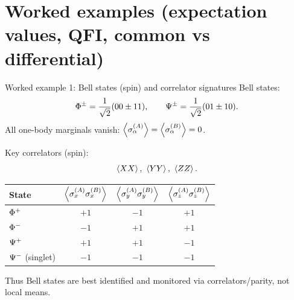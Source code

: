 \documentclass[aspectratio=169]{beamer}
\newcommand{\sA}[1]{\sigma_{#1}^{(A)}}
\newcommand{\sB}[1]{\sigma_{#1}^{(B)}}
\begin{document}
\section{Worked examples (expectation values, QFI, common vs differential)}

\begin{frame}{Worked example 1: Bell states (spin) and correlator signatures}
\small
Bell states:
\[
\relax{\Phi^\pm}=\frac{1}{\sqrt2}(\relax{00}\pm\relax{11}),
\qquad
\relax{\Psi^\pm}=\frac{1}{\sqrt2}(\relax{01}\pm\relax{10}).
\]
All one-body marginals vanish: $\expval{\sA{\alpha}}=\expval{\sB{\alpha}}=0$.

\vspace{0.35em}
Key correlators (spin):
\[
\expval{XX},\ \expval{YY},\ \expval{ZZ}.
\]

\begin{center}
\small
\begin{tabular}{lccc}
\toprule
State & $\expval{\sA{x}\sB{x}}$ & $\expval{\sA{y}\sB{y}}$ & $\expval{\sA{z}\sB{z}}$ \\
\midrule
$\relax{\Phi^+}$ & $+1$ & $-1$ & $+1$ \\
$\relax{\Phi^-}$ & $-1$ & $+1$ & $+1$ \\
$\relax{\Psi^+}$ & $+1$ & $+1$ & $-1$ \\
$\relax{\Psi^-}$ (singlet) & $-1$ & $-1$ & $-1$ \\
\bottomrule
\end{tabular}
\end{center}

\vspace{0.25em}
Thus Bell states are best identified and monitored via correlators/parity, not local means.
\end{frame}
\end{document}
